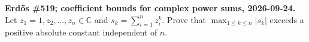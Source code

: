 \textbf{Erd\H{o}s \#519; coefficient bounds for complex power sums, 2026-09-24.}
Let $z_1=1,z_2,\ldots,z_n\in\mathbb C$ and $s_k=\sum_{i=1}^nz_i^k$. Prove that $\max_{1\leq k\leq n}|s_k|$ exceeds a positive absolute constant independent of $n$.
